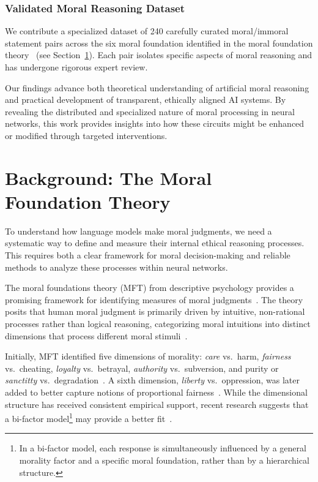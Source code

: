 \documentclass[runninghheads]{llncs}
\begin{document}
\subsubsection{Validated Moral Reasoning Dataset}
We contribute a specialized dataset of 240 carefully curated moral/immoral statement pairs across the six moral foundation identified in the moral foundation theory~\cite{Haidt2012} (see Section~\ref{MFT}). Each pair isolates specific aspects of moral reasoning and has undergone rigorous expert review.

Our findings advance both theoretical understanding of artificial moral reasoning and practical development of transparent, ethically aligned AI systems. By revealing the distributed and specialized nature of moral processing in neural networks, this work provides insights into how these circuits might be enhanced or modified through targeted interventions.



\section{Background: The Moral Foundation Theory}
\label{MFT}
To understand how language models make moral judgments, we need a systematic way to define and measure their internal ethical reasoning processes. This requires both a clear framework for moral decision-making and reliable methods to analyze these processes within neural networks.

The moral foundations theory (MFT) from descriptive psychology provides a promising framework for identifying measures of moral judgments~\cite{Haidt2004}. The theory posits that human moral judgment is primarily driven by intuitive, non-rational processes rather than logical reasoning, categorizing moral intuitions into distinct dimensions that process different moral stimuli~\cite{Simpson2020}.

Initially, MFT identified five dimensions of morality: \emph{care} vs.~harm, \emph{fairness} vs.~cheating, \emph{loyalty} vs.~betrayal, \emph{authority} vs.~subversion, and purity or \emph{sanctitty} vs.~degradation~\cite{Graham2011Mapping}. A sixth dimension, \emph{liberty} vs.~oppression, was later added to better capture notions of proportional fairness~\cite{Haidt2012}. 
While the dimensional structure has received consistent empirical support, recent research suggests that a bi-factor model\footnote{In a bi-factor model, each response is simultaneously influenced by a general morality factor and a specific moral foundation, rather than by a hierarchical structure.} may provide a better fit~\cite{Wormley2023Measuring}.
\end{document}
